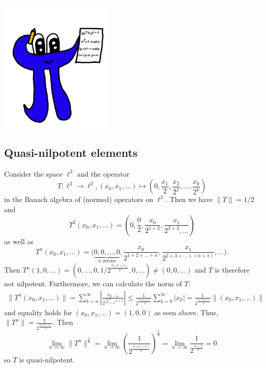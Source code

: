 \documentclass[a4paper]{article}
\begin{document}
\makeexheader

\begin{center}
    \includegraphics*[width=0.4\textwidth]{pi.png}
\end{center}


\setcounter{subsection}{2}
\subsection{Quasi-nilpotent elements}

Consider the space $\ell^2$  and the operator
\begin{equation*}
    T: \ell^2 \to \ell^2, (x_0, x_1, \dots) \mapsto \left(0, \frac{x_1}{2}, \frac{x_2}{2^2}, \dots, \frac{x_k}{2^k}\right)
\end{equation*}
in the Banach algebra of (normed) operators on $\ell^2$. Then we have $\|T\| = 1/2$ and
\begin{equation*}
    T^2(x_0, x_1, \dots) = \left(0, \frac{0}{2}, \frac{x_0}{2^{1+2}}, \frac{x_1}{2^{2 + 3}, \dots}\right)
\end{equation*}
as well as
\begin{equation*}
    T^n(x_0, x_1, \dots) = \bigg(\underbrace{0, 0, \dots, 0}_{n \text{ zeroes}}, \frac{x_0}{2^{1 + 2 + \dots + n}}, \frac{x_1}{2^{2 + 3 + \dots + (n+1)}}, \dots \bigg)\text{.}
\end{equation*}
Then $T^n(1, 0, \dots) = (0, \dots, 0, 1/2^{\frac{n(n+1)}{2}}, 0, \dots) \neq (0, 0, \dots)$ and $T$ is therefore not nilpotent.
Furthermore, we can calculate the norm of $T$:
\begin{align*}
    \|T^n(x_0, x_1, \dots)\| =\sum_{k = n}^{\infty} \left| \frac{x_{k-n}}{2^{\sum_{i=0}^n k+i}}  \right| \leq \frac{1}{2^{\frac{n(n+1)}{2}}} \sum_{k=0}^{\infty} \left| x_k \right| = \frac{1}{2^{\frac{n(n+1)}{2}}} \|(x_0, x_1, \dots)\|
\end{align*}
and equality holds for $(x_0, x_1, \dots) = (1, 0, 0)$ as seen above. Thus, $\|T^n\| = \frac{1}{2^{\frac{n(n+1)}{2}}}$.
Then
\begin{equation*}
    \lim_{n \to \infty} \| T^n \|^{\frac{1}{n}} 
    = \lim_{n \to \infty} \left(\frac{1}{2^{\frac{n(n+1)}{2}}} \right)^{\frac{1}{n}}
    = \lim_{n \to \infty} \frac{1}{2^{\frac{n+1}{2}}} 
    = 0
\end{equation*}
so $T$ is quasi-nilpotent.
\end{document}
